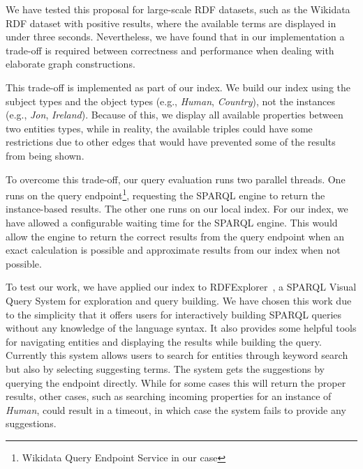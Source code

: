 We have tested this proposal for large-scale RDF datasets, such as the Wikidata RDF dataset with positive results, where the available terms are displayed in under three seconds. 
Nevertheless, we have found that in our implementation a trade-off is required between correctness and performance when dealing with elaborate graph constructions.

This trade-off is implemented as part of our index. 
We build our index using the subject types and the object types  (e.g., \textit{Human}, \textit{Country}), not the instances (e.g., \textit{Jon}, \textit{Ireland}). 
Because of this, we display all available properties between two entities types, while in reality, the available triples could have some restrictions due to other edges that would have prevented some of the results from being shown.

To overcome this trade-off, our query evaluation runs two parallel threads. 
One runs on the query endpoint\footnote{Wikidata Query Endpoint Service in our case}, requesting the SPARQL engine to return the instance-based results. The other one runs on our local index. 
For our index, we have allowed a configurable waiting time for the SPARQL engine. 
This would allow the engine to return the correct results from the query endpoint when an exact calculation is possible and approximate results from our index when not possible. 

To test our work, we have applied our index to RDFExplorer~\cite{Vargas2019}, a SPARQL Visual Query System for exploration and query building. 
We have chosen this work due to the simplicity that it offers users for interactively building SPARQL queries without any knowledge of the language syntax. 
It also provides some helpful tools for navigating entities and displaying the results while building the query. 
Currently this system allows users to search for entities through keyword search but also by selecting suggesting terms. 
The system gets the suggestions by querying the endpoint directly. 
While for some cases this will return the proper results, other cases, such as searching incoming properties for an instance of \textit{Human}, could result in a timeout, in which case the system fails to provide any suggestions.

